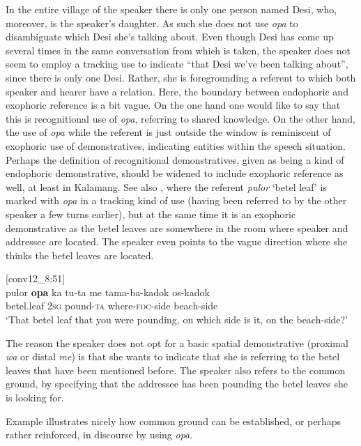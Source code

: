 \documentclass[output=paper,colorlinks,citecolor=brown]{langscibook}
\begin{document}
In the entire village of the speaker there is only one person named Desi, who, moreover, is the speaker's daughter. As such she does not use \textit{opa} to disambiguate which Desi she's talking about. Even though Desi has come up several times in the same conversation from which  is taken, the speaker does not seem to employ a tracking use to indicate ``that Desi we've been talking about'', since there is only one Desi. Rather, she is foregrounding a referent to which both speaker and hearer have a relation. Here, the boundary between endophoric and exophoric reference is a bit vague. On the one hand one would like to say that this is recognitional use of \textit{opa}, referring to shared knowledge. On the other hand, the use of \textit{opa} while the referent is just outside the window is reminiscent of exophoric use of demonstratives, indicating entities within the speech situation. Perhaps the definition of recognitional demonstratives, given as being a kind of endophoric demonstrative, should be widened to include exophoric reference as well, at least in Kalamang. See also , where the referent \textit{pulor} `betel leaf' is marked with \textit{opa} in a tracking kind of use (having been referred to by the other speaker a few turns earlier), but at the same time it is an exophoric demonstrative as the betel leaves are somewhere in the room where speaker and addressee are located. The speaker even points to the vague direction where she thinks the betel leaves are located.

\ea \label{exe:pulor} [conv12\_8:51]\\
\gll pulor \textbf{opa} ka tu-ta me tama-ba-kadok os-kadok\\
betel.leaf {\glopa} \textsc{2sg} pound-\textsc{ta} {\glme} where-\textsc{foc}-side beach-side\\
\glt 	`That betel leaf that you were pounding, on which side is it, on the beach-side?' 
\z 

The reason the speaker does not opt for a basic spatial demonstrative (proximal \textit{wa} or distal \textit{me}) is that she wants to indicate that she is referring to the betel leaves that have been mentioned before. The speaker also refers to the common ground, by specifying that the addressee has been pounding the betel leaves she is looking for.

Example  illustrates nicely how common ground can be established, or perhaps rather reinforced, in discourse by using \textit{opa}.
\end{document}
